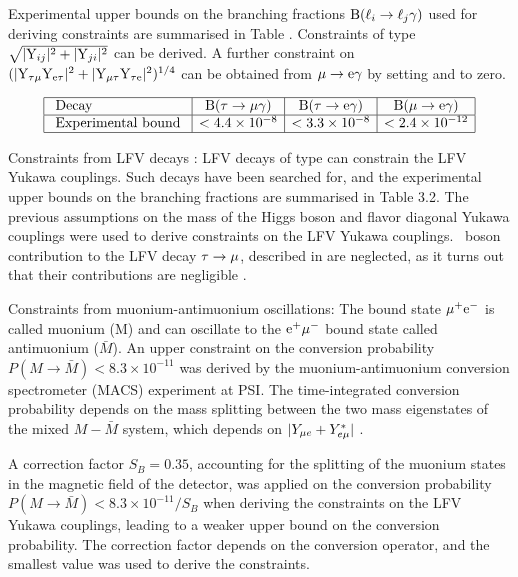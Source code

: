 Experimental upper bounds on the branching fractions $\mathrm{B}(\ell_{i} \to \ell_{j} \gamma )$ used for deriving constraints are summarised in Table \cite{tab:indirect}. Constraints of type $\sqrt{|\text{Y}_{ij}|^2+|\text{Y}_{ji}|^2}$ can be derived. A further constraint on $(|\text{Y}_{\tau\mu} \text{Y}_{\text{e}\tau}|^2 + |\text{Y}_{\mu\tau} \text{Y}_{\tau\text{e}}|^2)^{1 / 4}$ can be obtained from $\mu \to \text{e} \gamma$ by setting \Yme and \Yem to zero.

\begin{equation}
  \begin{array}{|l|c|c|c|}
    \hline \text { Decay } & \mathrm{B}(\tau \to \mu \gamma) & \mathrm{B}(\tau \to \text{e} \gamma) & \mathrm{B}(\mu \to \text{e} \gamma) \\
    \hline \text { Experimental bound } & <4.4 \times 10^{-8} & <3.3 \times 10^{-8} & <2.4 \times 10^{-12} \\
    \hline
  \end{array}
\end{equation}

Constraints from LFV decays \ltl: LFV decays of type \ltl can constrain the LFV Yukawa couplings. Such decays have been searched for, and the experimental upper bounds on the branching fractions are summarised in Table 3.2. The previous assumptions on the mass of the Higgs boson and flavor diagonal Yukawa couplings were used to derive constraints on the LFV Yukawa couplings. \PZ\, boson contribution to the LFV decay $\tau \to \mu$, described in are neglected, as it turns out that their contributions are negligible \cite{Goto:2015iha}.

Constraints from muonium-antimuonium oscillations: The bound state $\mu^{+} \text{e}^{-}$ is called muonium (M) and can oscillate to the $ \text{e}^{+} \mu^{-}$ bound state called antimuonium ($\bar{M}$). An upper constraint on the conversion probability $P(M \to \bar{M})<8.3 \times 10^{-11}$ \cite{Willmann:1998gd} was derived by the muonium-antimuonium conversion spectrometer (MACS) experiment at PSI. The time-integrated conversion probability depends on the mass splitting between the two mass eigenstates of the mixed $M-\bar{M}$ system, which depends on $|Y_{\mu e}+Y_{e \mu}^{*}|$ \cite{Harnik:2012pb}.

A correction factor $S_{B} = 0.35$, accounting for the splitting of the muonium states in the magnetic field of the detector, was applied on the conversion probability $P(M \to \bar{M})<8.3 \times 10^{-11} / S_{B}$ when deriving the constraints on the LFV Yukawa couplings, leading to a weaker upper bound on the conversion probability. The correction factor depends on the conversion operator, and the smallest value was used to derive the constraints.


